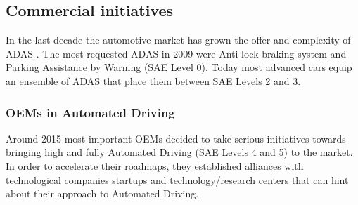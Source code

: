 \subsection{Commercial initiatives}

In the last decade the automotive market has grown the offer and complexity
of ADAS \cite{Perez2016}. The most requested ADAS in 2009
\cite{Frost&Sullivan2010} were Anti-lock braking system and Parking Assistance
by Warning (SAE Level 0). Today most advanced cars equip an ensemble of
ADAS that place them between SAE Levels 2 and 3. 

\subsubsection{OEMs in Automated Driving}
\label{sec:oem-ad}

Around 2015 most important OEMs decided to take serious initiatives towards
bringing high and fully Automated Driving (SAE Levels 4 and 5) to the market.
In order to accelerate their roadmaps, they established alliances with
technological companies startups and technology/research centers that
can hint about their approach to Automated Driving.


